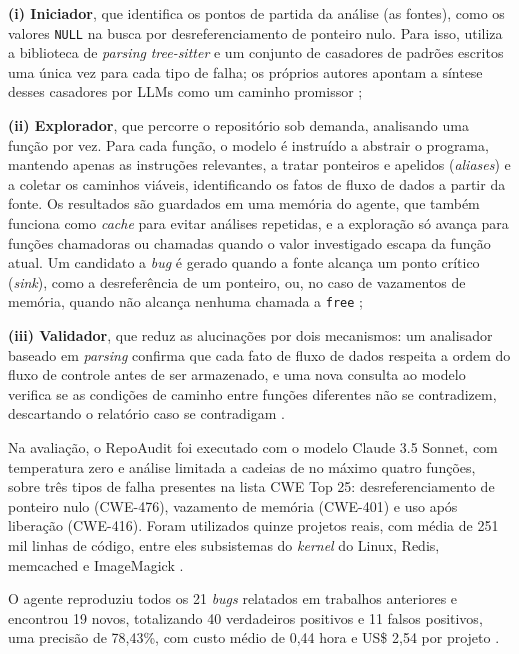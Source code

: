 \documentclass[
    12pt,                %
    openright,           %
    oneside,             %
    a4paper,             %
    english,             %
    brazil               %
]{abntex2}
\begin{document}
\par
\textbf{(i) Iniciador}, que identifica os pontos de partida da análise (as fontes), como os valores \texttt{NULL} na busca por desreferenciamento de ponteiro nulo.
Para isso, utiliza a biblioteca de \textit{parsing} \textit{tree-sitter} e um conjunto de casadores de padrões escritos uma única vez para cada tipo de falha; os próprios autores apontam a síntese desses casadores por LLMs como um caminho promissor \cite{guo2025repoaudit};
\par
\textbf{(ii) Explorador}, que percorre o repositório sob demanda, analisando uma função por vez.
Para cada função, o modelo é instruído a abstrair o programa, mantendo apenas as instruções relevantes, a tratar ponteiros e apelidos (\textit{aliases}) e a coletar os caminhos viáveis, identificando os fatos de fluxo de dados a partir da fonte.
Os resultados são guardados em uma memória do agente, que também funciona como \textit{cache} para evitar análises repetidas, e a exploração só avança para funções chamadoras ou chamadas quando o valor investigado escapa da função atual.
Um candidato a \textit{bug} é gerado quando a fonte alcança um ponto crítico (\textit{sink}), como a desreferência de um ponteiro, ou, no caso de vazamentos de memória, quando não alcança nenhuma chamada a \texttt{free} \cite{guo2025repoaudit};
\par
\textbf{(iii) Validador}, que reduz as alucinações por dois mecanismos: um analisador baseado em \textit{parsing} confirma que cada fato de fluxo de dados respeita a ordem do fluxo de controle antes de ser armazenado, e uma nova consulta ao modelo verifica se as condições de caminho entre funções diferentes não se contradizem, descartando o relatório caso se contradigam \cite{guo2025repoaudit}.
\par
Na avaliação, o RepoAudit foi executado com o modelo Claude 3.5 Sonnet, com temperatura zero e análise limitada a cadeias de no máximo quatro funções, sobre três tipos de falha presentes na lista CWE Top 25: desreferenciamento de ponteiro nulo (CWE-476), vazamento de memória (CWE-401) e uso após liberação (CWE-416).
Foram utilizados quinze projetos reais, com média de 251 mil linhas de código, entre eles subsistemas do \textit{kernel} do Linux, Redis, memcached e ImageMagick \cite{guo2025repoaudit}.
\par
O agente reproduziu todos os 21 \textit{bugs} relatados em trabalhos anteriores e encontrou 19 novos, totalizando 40 verdadeiros positivos e 11 falsos positivos, uma precisão de 78,43\%, com custo médio de 0,44 hora e US\$ 2,54 por projeto \cite{guo2025repoaudit}.
\end{document}
